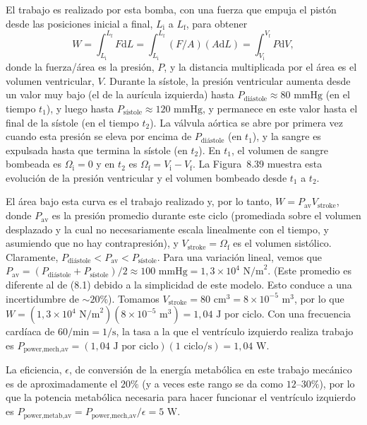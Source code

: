 \documentclass[12pt]{book}
\begin{document}
El trabajo es realizado por esta bomba, con una fuerza que empuja el pistón desde las posiciones inicial a final, $L_{\text{i}}$ a $L_{\text{f}}$, para obtener
\begin{equation}
W = \int_{L_{\text{i}}}^{L_{\text{f}}} F \mathrm{d}L = \int_{L_{\text{i}}}^{L_{\text{f}}} (F/A)(A \mathrm{d}L) = \int_{V_{\text{i}}}^{V_{\text{f}}} P \mathrm{d}V,
\label{eq:835}
\end{equation}
donde la fuerza/área es la presión, $P$, y la distancia multiplicada por el área es el volumen ventricular, $V$. Durante la sístole, la presión ventricular aumenta desde un valor muy bajo (el de la aurícula izquierda) hasta $P_{\text{di\'{a}stole}} \approx 80\text{ mmHg}$ (en el tiempo $t_1$), y luego hasta $P_{\text{s\'{i}stole}} \approx 120\text{ mmHg}$, y permanece en este valor hasta el final de la sístole (en el tiempo $t_2$). La válvula aórtica se abre por primera vez cuando esta presión se eleva por encima de $P_{\text{di\'{a}stole}}$ (en $t_1$), y la sangre es expulsada hasta que termina la sístole (en $t_2$). En $t_1$, el volumen de sangre bombeada es $\Omega_{\text{i}} = 0$ y en $t_2$ es $\Omega_{\text{f}} = V_{\text{i}} - V_{\text{f}}$. La Figura~8.39 muestra esta evolución de la presión ventricular y el volumen bombeado desde $t_1$ a $t_2$.

El área bajo esta curva es el trabajo realizado y, por lo tanto, $W = P_{\text{av}} V_{\text{stroke}}$, donde $P_{\text{av}}$ es la presión promedio durante este ciclo (promediada sobre el volumen desplazado y la cual no necesariamente escala linealmente con el tiempo, y asumiendo que no hay contrapresión), y $V_{\text{stroke}} = \Omega_{\text{f}}$ es el volumen sistólico. Claramente, $P_{\text{di\'{a}stole}} < P_{\text{av}} < P_{\text{s\'{i}stole}}$. Para una variación lineal, vemos que $P_{\text{av}} = (P_{\text{di\'{a}stole}} + P_{\text{s\'{i}stole}})/2 \approx 100\text{ mmHg} = 1{,}3 \times 10^4\text{ N/m}^2$. (Este promedio es diferente al de (8.1) debido a la simplicidad de este modelo. Esto conduce a una incertidumbre de ${\sim}20\%$). Tomamos $V_{\text{stroke}} = 80\text{ cm}^3 = 8 \times 10^{-5}\text{ m}^3$, por lo que $W = (1{,}3 \times 10^4\text{ N/m}^2)(8 \times 10^{-5}\text{ m}^3) = 1{,}04\text{ J}$ por ciclo. Con una frecuencia cardíaca de $60\text{/min} = 1\text{/s}$, la tasa a la que el ventrículo izquierdo realiza trabajo es $P_{\text{power,mech,av}} = (1{,}04\text{ J por ciclo})(1\text{ ciclo/s}) = 1{,}04\text{ W}$.

La eficiencia, $\epsilon$, de conversión de la energía metabólica en este trabajo mecánico es de aproximadamente el $20\%$ (y a veces este rango se da como $12\text{--}30\%$), por lo que la potencia metabólica necesaria para hacer funcionar el ventrículo izquierdo es $P_{\text{power,metab,av}} = P_{\text{power,mech,av}}/\epsilon = 5\text{ W}$.
\end{document}
